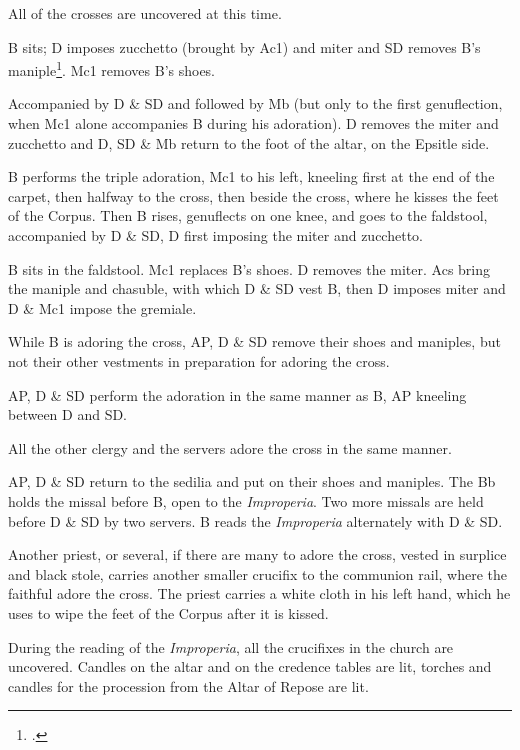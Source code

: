{    %
    \rubric All of the crosses are uncovered at this time.

    \rubric B sits; D imposes zucchetto (brought by Ac1) and miter and SD
    removes B's maniple\footcite[][p. 204, note 6.]{stehle}. Mc1 removes B's
    shoes. 


    \rubric Accompanied by D \& SD and followed by Mb (but only to the first
    genuflection, when Mc1 alone accompanies B during his adoration). D removes
    the miter and zucchetto and D, SD \& Mb return to the foot of the altar, on
    the Epsitle side.

    \rubric B performs the triple adoration, Mc1 to his left, kneeling first at
    the end of the carpet, then halfway to the cross, then beside the cross,
    where he kisses the feet of the Corpus. Then B rises, genuflects on one
    knee, and goes to the faldstool, accompanied by D \& SD, D first imposing
    the miter and zucchetto.

    \rubric B sits in the faldstool. Mc1 replaces B's shoes. D removes the
    miter. Acs bring the maniple and chasuble, with which D \& SD vest B, then
    D imposes miter and D \& Mc1 impose the gremiale.

    \rubric While B is adoring the cross, AP, D \& SD remove their shoes and
    maniples, but not their other vestments in preparation for adoring the
    cross.

    \rubric AP, D \& SD perform the adoration in the same manner as B, AP
    kneeling between D and SD.

    \rubric All the other clergy and the servers adore the cross in the same
    manner.


    \rubric AP, D \& SD return to the sedilia and put on their shoes and
    maniples. The Bb holds the missal before B, open to the
    \textit{Improperia}. Two more missals are held before D \& SD by two
    servers. B reads the \textit{Improperia} alternately with D \& SD.

    \rubric Another priest, or several, if there are many to adore the cross,
    vested in surplice and black stole, carries another smaller crucifix to the
    communion rail, where the faithful adore the cross. The priest carries a
    white cloth in his left hand, which he uses to wipe the feet of the Corpus
    after it is kissed.


    \rubric During the reading of the \textit{Improperia}, all the crucifixes
    in the church are uncovered. Candles on the altar and on the credence
    tables are lit, torches and candles for the procession from the Altar of
    Repose are lit.

}

